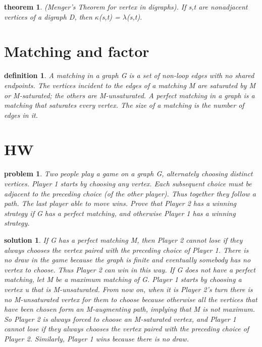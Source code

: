 \documentclass[twocolumn]{article}
\newtheorem{theorem}{theorem}[section]  %
\newtheorem{definition}{definition}
\newtheorem{problem}{problem}
\newtheorem{solution}{solution}
\begin{document}
\begin{CJK*}{UTF8}{bkai}
    \begin{theorem}{(Menger’s Theorem for vertex in digraphs).}
         If s,t are nonadjacent vertices of a digraph D, then $\kappa$(s,t) = $\lambda$(s,t).
    \end{theorem}

\section{Matching and factor}
    \begin{definition}
        A matching in a graph G is a set of non-loop edges with no shared endpoints.
 The vertices incident to the edges of a matching M are saturated by M or
 M-saturated; the others are M-unsaturated. A perfect matching in a graph is
 a matching that saturates every vertex. The size of a matching is the number
 of edges in it.
    \end{definition}

\section{HW}

\begin{problem}
 Two people play a game on a graph G, alternately choosing distinct vertices. Player 1 starts by
 choosing any vertex. Each subsequent choice must be adjacent to the preceding choice (of the other
 player). Thus together they follow a path. The last player able to move wins.
 Prove that Player 2 has a winning strategy if G has a perfect matching, and otherwise Player 1 has
 a winning strategy.
\end{problem}

\begin{solution}
 If G has a perfect matching M, then Player 2 cannot lose if they always chooses the vertex paired
 with the preceding choice of Player 1. There is no draw in the game because the graph is finite and
 eventually somebody has no vertex to choose. Thus Player 2 can win in this way.
 If G does not have a perfect matching, let M be a maximum matching of G. Player 1 starts by
 choosing a vertex u that is M-unsaturated. From now on, when it is Player 2's turn there is no
 M-unsaturated vertex for them to choose because otherwise all the vertices that have been chosen
 form an M-augmenting path, implying that M is not maximum. So Player 2 is always forced to
 choose an M-saturated vertex, and Player 1 cannot lose if they always chooses the vertex paired
 with the preceding choice of Player 2. Similarly, Player 1 wins because there is no draw.
\end{solution}


\end{CJK*}
\end{document}
